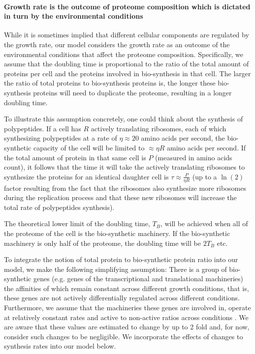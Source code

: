 \documentclass[10pt,letterpaper]{article}
\begin{document}
\paragraph{Growth rate is the outcome of proteome composition which is dictated in turn by the environmental conditions}

While it is sometimes implied that different cellular components are regulated by the growth rate, our model considers the growth rate as an outcome of the environmental conditions that affect the proteome composition.
Specifically, we assume that the doubling time is proportional to the ratio of the total amount of proteins per cell and the proteins involved in bio-synthesis in that cell.
The larger the ratio of total proteins to bio-synthesis proteins is, the longer these bio-synthesis proteins will need to duplicate the proteome, resulting in a longer doubling time.

To illustrate this assumption concretely, one could think about the synthesis of polypeptides.
If a cell has $R$ actively translating ribosomes, each of which synthesizing polypeptides at a rate of $\eta \approx 20$ amino acids per second, the bio-synthetic capacity of the cell will be limited to $\approx \eta R$ amino acids per second.
If the total amount of protein in that same cell is $P$ (measured in amino acids count), it follows that the time it will take the actively translating ribosomes to synthesize the proteins for an identical daughter cell is $\tau \approx \frac{P}{\eta R}$ (up to a $\ln(2)$ factor resulting from the fact that the ribosomes also synthesize more ribosomes during the replication process and that these new ribosomes will increase the total rate of polypeptides synthesis).


The theoretical lower limit of the doubling time, $T_B$, will be achieved when all of the proteome of the cell is the bio-synthetic machinery.
If the bio-synthetic machinery is only half of the proteome, the doubling time will be $2T_B$ etc.

To integrate the notion of total protein to bio-synthetic protein ratio into our model, we make the following simplifying assumption:
There is a group of bio-synthetic genes (e.g. genes of the transcriptional and translational machineries) the affinities of which remain constant across different growth conditions, that is, these genes are not actively differentially regulated across different conditions.
Furthermore, we assume that the machineries these genes are involved in, operate at relatively constant rates and active to non-active ratios across conditions \cite{Bremer1987}.
We are aware that these values are estimated to change by up to 2 fold and, for now, consider such changes to be negligible.
We incorporate the effects of changes to synthesis rates into our model below.
\end{document}
